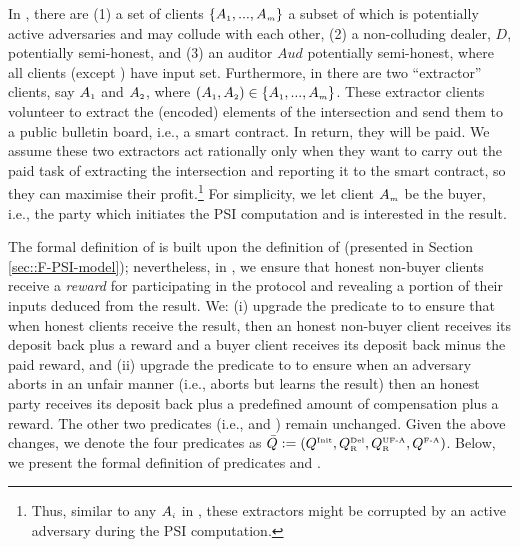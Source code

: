 In \ep, there are (1) a set of clients $\{A_{\scriptscriptstyle 1},...,A_{\scriptscriptstyle m}\}$ a subset of which is potentially active adversaries and may collude with each other, (2) a non-colluding dealer, $D$, potentially semi-honest, and (3) an auditor $Aud$ potentially semi-honest, where all clients (except \aud) have input set. Furthermore,  in \ep  there are two ``extractor'' clients, say $A_{\scriptscriptstyle 1}$ and $A_{\scriptscriptstyle 2}$, where $(A_{\scriptscriptstyle 1},A_{\scriptscriptstyle 2})\in \{A_{\scriptscriptstyle 1},...,A_{\scriptscriptstyle m}\}$. These extractor clients volunteer to extract the (encoded) elements of the intersection and send them to a public bulletin board, i.e., a smart contract. In return, they will be paid. 
%
%
We assume these two extractors act rationally only when they want to carry out the paid task of extracting the intersection and reporting it to the smart contract, so they can maximise their profit.\footnote{Thus, similar to any $A_{\scriptscriptstyle i}$ in \p, these extractors might be corrupted by an active adversary during the PSI computation.} For simplicity, we let client $A_{\scriptscriptstyle m}$ be the buyer, i.e., the party which initiates the PSI computation and is interested in the result. 


 The formal definition of \ep is built upon the definition of \p (presented in Section \ref{sec::F-PSI-model}); nevertheless, in \ep, we ensure that honest non-buyer clients receive a \emph{reward} for participating in the protocol and revealing a portion of their inputs deduced from the result. We:  (i)  upgrade the predicate \qdel to  \qdelwr to ensure that when honest clients receive the result, then an honest non-buyer client receives its deposit back plus a reward and a buyer client receives its deposit back minus the paid reward, and (ii) upgrade the predicate  \qUnFAbt to \qUnFAbtwr to ensure when an adversary aborts in an unfair manner (i.e., aborts but learns the result) then an honest party receives its deposit back plus a predefined amount of compensation plus a reward.  The other two predicates (i.e., \qinit and \qFAbt) remain unchanged. Given the above changes, we denote the four predicates as $\bar Q:=(Q^{\scriptscriptstyle \text{Init}},  Q^{\scriptscriptstyle \text{Del}}_{\scriptscriptstyle\text{R}}, Q^{\scriptscriptstyle \text{UF-A}}_{\scriptscriptstyle \text{R}}, Q^{\scriptscriptstyle \text{F-A}})$. Below, we present the formal definition of predicates \qdelwr and \qUnFAbtwr. 
 
 
 

